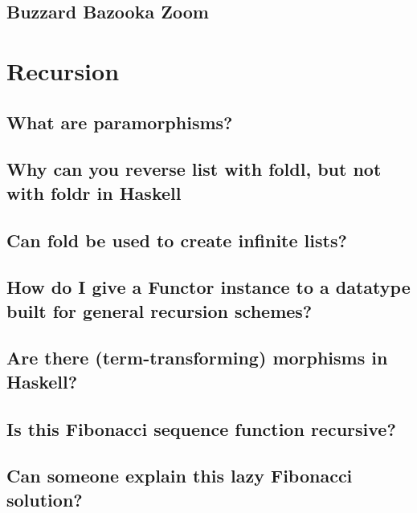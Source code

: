 \documentclass{book}
\begin{document}
\section{Buzzard Bazooka Zoom}




\chapter{Recursion}

\section{What are paramorphisms?}


\section{Why can you reverse list with foldl, but not with foldr in Haskell}


\section{Can fold be used to create infinite lists?}


\section{How do I give a Functor instance to a datatype built for general recursion schemes?}


\section{Are there (term-transforming) morphisms in Haskell?}


\section{Is this Fibonacci sequence function recursive?}


\section{Can someone explain this lazy Fibonacci solution?}

\end{document}
